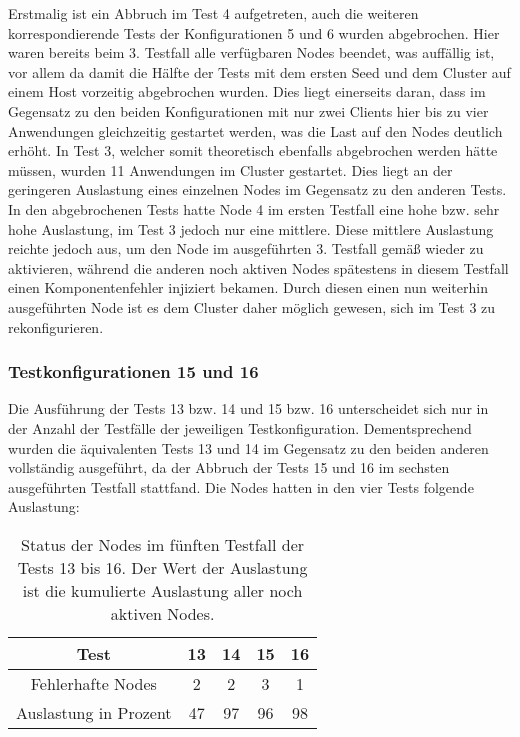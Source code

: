 Erstmalig ist ein Abbruch im Test 4 aufgetreten, auch die weiteren korrespondierende Tests der Konfigurationen 5 und 6 wurden abgebrochen.
Hier waren bereits beim 3. Testfall alle verfügbaren Nodes beendet, was auffällig ist, vor allem da damit die Hälfte der Tests mit dem ersten Seed und dem Cluster auf einem Host vorzeitig abgebrochen wurden.
Dies liegt einerseits daran, dass im Gegensatz zu den beiden Konfigurationen mit nur zwei Clients hier bis zu vier Anwendungen gleichzeitig gestartet werden, was die Last auf den Nodes deutlich erhöht.
In Test 3, welcher somit theoretisch ebenfalls abgebrochen werden hätte müssen, wurden 11 Anwendungen im Cluster gestartet.
Dies liegt an der geringeren Auslastung eines einzelnen Nodes im Gegensatz zu den anderen Tests.
In den abgebrochenen Tests hatte Node 4 im ersten Testfall eine hohe bzw. sehr hohe Auslastung, im Test 3 jedoch nur eine mittlere.
Diese mittlere Auslastung reichte jedoch aus, um den Node im ausgeführten 3. Testfall gemäß  wieder zu aktivieren, während die anderen noch aktiven Nodes spätestens in diesem Testfall einen Komponentenfehler injiziert bekamen.
Durch diesen einen nun weiterhin ausgeführten Node ist es dem Cluster daher möglich gewesen, sich im Test 3 zu rekonfigurieren.

\subsubsection{Testkonfigurationen 15 und 16}
\label{sec:noReconf1516}

Die Ausführung der Tests 13 bzw. 14 und 15 bzw. 16 unterscheidet sich nur in der Anzahl der Testfälle der jeweiligen Testkonfiguration.
Dementsprechend wurden die äquivalenten Tests 13 und 14 im Gegensatz zu den beiden anderen vollständig ausgeführt, da der Abbruch der Tests 15 und 16 im sechsten ausgeführten Testfall stattfand.
Die Nodes hatten in den vier Tests folgende Auslastung:

\begin{table}[h]
    \begin{tabular}{c|cccc}
    	        Test          & 13 & 14 & 15 & 16 \\ \hline
    	  Fehlerhafte Nodes   & 2  & 2  & 3  & 1  \\
    	Auslastung in Prozent & 47 & 97 & 96 & 98
    \end{tabular}
    \caption[Status der Nodes im fünften Testfall der Tests 13 bis 16]
        {Status der Nodes im fünften Testfall der Tests 13 bis 16.
        Der Wert der Auslastung ist die kumulierte Auslastung aller noch aktiven Nodes.}
    \label{tab:loadTests1316}
\end{table}

